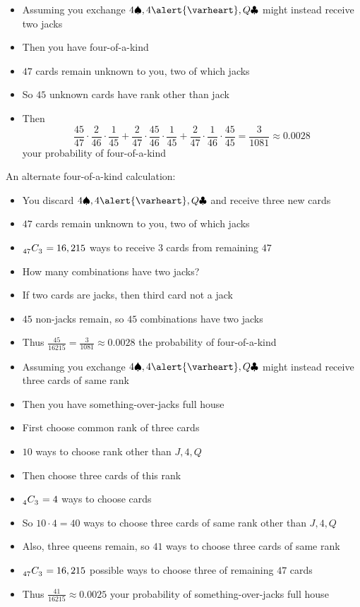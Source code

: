 \documentclass{beamer}
\theoremstyle{definition}
\newcommand\ncr[2]{\tensor[_{#1}]C{_{#2}}}
\newcommand{\hs}{\alert{\varheart}}
\newcommand{\s}{\spadesuit}
\newcommand{\cs}{\clubsuit}
\begin{document}
\begin{frame}
\begin{itemize}
\item Assuming you exchange $4\s,4\hs,Q\cs$
might instead receive \alert{two} jacks
\item Then you have four-of-a-kind
\item $47$ cards remain unknown to you, two of which jacks
\item So $45$ unknown cards have rank other than jack
\item Then \[\frac{45}{47}\cdot\frac{2}{46}\cdot\frac{1}{45}
+\frac{2}{47}\cdot\frac{45}{46}\cdot\frac{1}{45}
+\frac{2}{47}\cdot\frac{1}{46}\cdot\frac{45}{45}
=\frac{3}{1081}\approx 0.0028\]
your probability of four-of-a-kind
\end{itemize}
\end{frame}

\begin{frame}
An alternate four-of-a-kind calculation:
\begin{itemize}
\item You discard $4\s,4\hs,Q\cs$ and receive three new cards
\item $47$ cards remain unknown to you, two of which jacks
\item $\ncr{47}{3}=16,215$ ways to receive $3$ cards from remaining $47$
\item How many combinations have two jacks?
\item If two cards are jacks, then third card not a jack
\item $45$ non-jacks remain, so $45$ combinations
have two jacks
\item Thus $\frac{45}{16215}=\frac{3}{1081}\approx 0.0028$
the probability of four-of-a-kind
\end{itemize}
\end{frame}

\begin{frame}
\begin{itemize}
\item Assuming you exchange $4\s,4\hs,Q\cs$
might instead receive three cards of same rank
\item Then you have \alert{something-over-jacks full house}
\item First choose common rank of three cards
\item $10$ ways to choose rank other than $J,4,Q$
\item Then choose three cards of this rank
\item $\ncr{4}{3}=4$ ways to choose cards
\item So $10\cdot 4=40$ ways to choose three cards of
same rank other than $J,4,Q$
\item Also, three queens remain, so $41$ ways
to choose three cards of same rank
\item $\ncr{47}{3}=16,215$ possible ways to
choose three of remaining $47$ cards
\item Thus $\frac{41}{16215}\approx 0.0025$
your probability of something-over-jacks full house
\end{itemize}
\end{frame}
\end{document}
